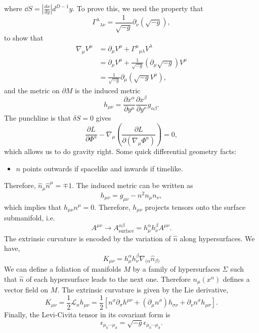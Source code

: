 \documentclass{article}
\numberwithin{equation}{section}
\begin{document}
 where $\dd{S} = \left|\frac{dx}{dy}\right| d^{D-1}y.$ To prove this, we need the property that 
 \begin{equation}
    \Gamma^{\lambda}{}_{\lambda\nu} = \frac{1}{\sqrt{-g}}\partial_\nu(\sqrt{-g}),
 \end{equation}
 to show that 
 \begin{align}
    \nabla_\mu V^{\mu} &= \partial_{\mu}V^\mu + \Gamma^{\mu}{}_{\mu\lambda}V^{\lambda} \\ 
    &= \partial_\mu V^{\mu} + \frac{1}{\sqrt{-g}}(\partial_\mu \sqrt{-g})V^{\mu} \\ 
    &= \frac{1}{\sqrt{-g}}\partial_\mu(\sqrt{-g}V^{\mu}),
 \end{align}
 and the metric on $\partial M$ is the induced metric 
 \begin{equation}
    h_{\mu\nu} = \frac{\partial x^{\alpha}}{\partial y^\mu}\frac{\partial x^\beta}{\partial y^{\nu}}g_{\alpha\beta}.
 \end{equation}
 The punchline is that $\delta S=0$ gives 
 \begin{equation}
    \frac{\partial L}{\partial \Phi^a} - \nabla_\mu \left(\frac{\partial L}{\partial (\nabla_\mu \Phi^a)}\right) = 0,
 \end{equation}
 which allows us to do gravity right. Some quick differential geometry facts:
 \begin{itemize}
    \item $\hat{n}$ points outwards if spacelike and inwards if timelike.
 \end{itemize}
 Therefore, $\hat{n}_{\mu}\hat{n}^{\mu} = \mp 1.$ The induced metric can be written as 
 \begin{equation}
    h_{\mu \nu} = g_{\mu\nu} - n^2n_\mu n_\nu,
 \end{equation}
 which implies that $h_{\mu\nu}n^\mu = 0.$ Therefore, $h_{\mu\nu}$ projects tensors onto the surface submanifold, i.e. 
 \begin{equation}
    A^{\mu\nu} \to A^{\alpha\beta}_{\text{surface}} = h^\alpha_{\mu}h^{\beta}_{\nu}A^{\mu\nu}.
 \end{equation}
 The extrinsic curvature is encoded by the variation of $\hat{n}$ along hypersurfaces. We have,
 \begin{equation}
    K_{\mu\nu} = h^{\alpha}_{\mu}h^{\beta}_{\nu}\nabla_{(\alpha}\hat{n}_{\beta)}
 \end{equation}
 We can define a foliation of manifolds $M$ by a family of hypersurfaces $\Sigma$ such that $\hat{n}$ of each hypersurface leads to the next one. Therefore $n_{\mu}(x^\alpha)$ defines a vector field on $M.$ The extrinsic curvature is given by the Lie derivative,
 \begin{equation}
    K_{\mu\nu} = \frac{1}{2}\mathcal{L}_n h_{\mu\nu} = \frac{1}{2}\left[n^\sigma \partial_\sigma h^{\mu\nu} + (\partial_\mu n^\sigma)h_{\sigma\nu}+\partial_\nu n^{\sigma}h_{\mu\sigma}\right].
 \end{equation}
 Finally, the Levi-Civita tensor in its covariant form is 
 \begin{equation}
    \epsilon_{\mu_0\cdots \mu_d}=\sqrt{-g} \epsilon_{\mu_0\cdots \mu_d}.
 \end{equation}
\end{document}
